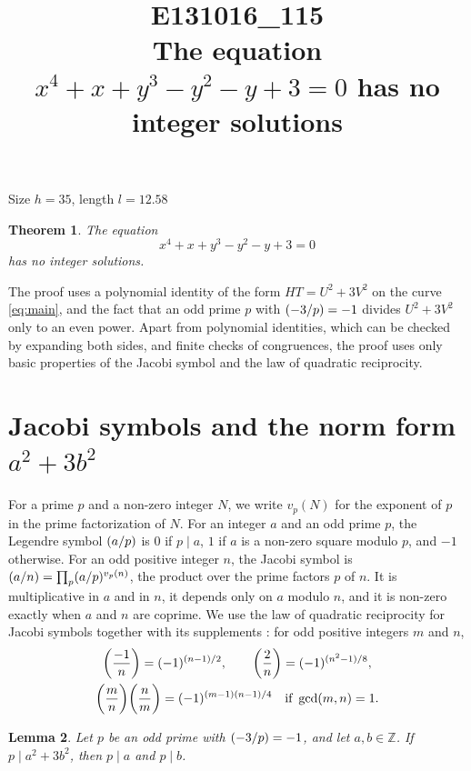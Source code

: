\documentclass[11pt]{article}
\title{\textbf{E131016\_115}\\[4pt] {\Large The equation $x^{4}+x+y^{3}-y^{2}-y+3=0$ has no integer solutions}}
\author{}
\date{}
\newtheorem{theorem}{Theorem}
\newtheorem{lemma}[theorem]{Lemma}
\newcommand{\Z}{\mathbb{Z}}
\newcommand{\leg}[2]{\mathchoice{\biggl(\dfrac{#1}{#2}\biggr)}{(#1/#2)}{(#1/#2)}{(#1/#2)}}
\begin{document}
\maketitle
\vspace{-8ex}
\begin{center}
Size $h=35$, length $l=12.58$
\end{center}

\begin{theorem}\label{thm:main}
The equation
\begin{equation}\label{eq:main}
x^{4}+x+y^{3}-y^{2}-y+3=0
\end{equation}
has no integer solutions.
\end{theorem}

The proof uses a polynomial identity of the form $HT=U^2+3V^2$ on the curve \eqref{eq:main}, and the fact that an odd prime $p$ with $\leg{-3}{p}=-1$ divides $U^2+3V^2$ only to an even power. Apart from polynomial identities, which can be checked by expanding both sides, and finite checks of congruences, the proof uses only basic properties of the Jacobi symbol and the law of quadratic reciprocity.

\section{\texorpdfstring{Jacobi symbols and the norm form $a^2+3b^2$}{Jacobi symbols and the norm form}}

For a prime $p$ and a non-zero integer $N$, we write $v_p(N)$ for the exponent of $p$ in the prime factorization of $N$. For an integer $a$ and an odd prime $p$, the Legendre symbol $\leg{a}{p}$ is $0$ if $p\mid a$, $1$ if $a$ is a non-zero square modulo $p$, and $-1$ otherwise. For an odd positive integer $n$, the Jacobi symbol is $\leg{a}{n}=\prod_p\leg{a}{p}^{v_p(n)}$, the product over the prime factors $p$ of $n$. It is multiplicative in $a$ and in $n$, it depends only on $a$ modulo $n$, and it is non-zero exactly when $a$ and $n$ are coprime. We use the law of quadratic reciprocity for Jacobi symbols together with its supplements \cite[Chapter~5, \S2]{IR}: for odd positive integers $m$ and $n$,
\begin{gather*}
\leg{-1}{n}=(-1)^{(n-1)/2},\qquad\leg{2}{n}=(-1)^{(n^2-1)/8},\\
\leg{m}{n}\leg{n}{m}=(-1)^{(m-1)(n-1)/4}\quad\text{if }\gcd(m,n)=1.
\end{gather*}

\begin{lemma}\label{lem:divides}
Let $p$ be an odd prime with $\leg{-3}{p}=-1$, and let $a,b\in\Z$. If $p\mid a^2+3b^2$, then $p\mid a$ and $p\mid b$.
\end{lemma}
\end{document}

